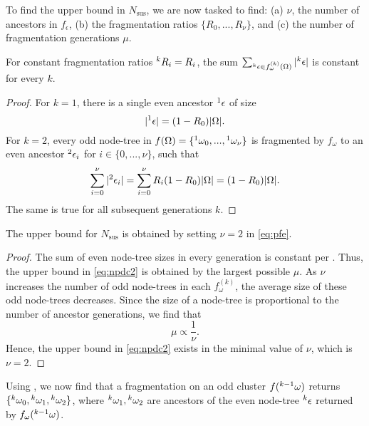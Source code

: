 To find the upper bound in $N_{\text{sus}}$, we are now tasked to find: (a) $\nu$, the number of ancestors in $f_\epsilon$, (b) the fragmentation ratios $\{R_0, ..., R_\nu\}$, and (c) the number of fragmentation generations $\mu$. 

\begin{lemma}\label{lem:evenconstant}
  For constant fragmentation ratios ${}^{k}R_i = R_i$, the sum $\sum_{ {}^{k}\epsilon \in f_\omega^{(k)}(\Omega) }{ \lvert{}^{k}\epsilon\rvert}$ is constant for every $k$. 
\end{lemma}
\begin{proof}
  For $k=1$, there is a single even ancestor ${}^{1}\epsilon$ of size 
  \begin{equation*}
    \lvert{}^{1}\epsilon\rvert = (1 - R_0)\lvert\Omega\rvert.
  \end{equation*}
  For $k=2$, every odd node-tree in $f(\Omega)=\{{}^{1}\omega_0,...,{}^{1}\omega_\nu\}$ is fragmented by $f_\omega$ to an even ancestor ${}^{2}\epsilon_i$ for $i \in \{0,...,\nu \}$, such that 
  \begin{equation*}
    \sum_{i=0}^{\nu}{\lvert{}^{2}\epsilon_i\rvert}  = \sum_{i=0}^{\nu}{R_i(1 - R_0)\lvert\Omega\rvert}= (1 - R_0)\lvert\Omega\rvert.
  \end{equation*}
  The same is true for all subsequent generations $k$. 
\end{proof}

\begin{theorem}\label{the:fragnumber}
  The upper bound for $N_{\text{sus}}$ is obtained by setting $\nu=2$ in \eqref{eq:pfe}. 
\end{theorem}
\begin{proof}
  The sum of even node-tree sizes in every generation is constant per . Thus, the upper bound in \eqref{eq:npdc2} is obtained by the largest possible $\mu$. As $\nu$ increases the number of odd node-trees in each $f^{(k)}_\omega$, the average size of these odd node-trees decreases. Since the size of a node-tree is proportional to the number of ancestor generations, we find that 
  \begin{equation*}
    \mu \propto \frac{1}{\nu}. 
  \end{equation*}
  Hence, the upper bound in \eqref{eq:npdc2} exists in the minimal value of $\nu$, which is $\nu = 2$.
\end{proof}

Using , we now find that a fragmentation on an odd cluster $f({}^{k-1}\omega)$ returns $\{{}^{k}\omega_0, {}^{k}\omega_1, {}^{k}\omega_2\}$, where ${}^{k}\omega_1, {}^{k}\omega_2$ are ancestors of the even node-tree ${}^{k}\epsilon$ returned by $f_\omega({}^{k-1}\omega)$. 

